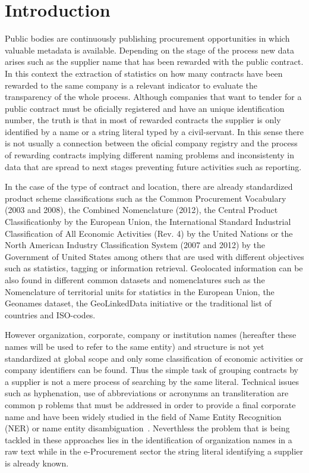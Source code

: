 \documentclass{llncs}
\begin{document}
\section{Introduction}
Public bodies are continuously publishing procurement opportunities in which 
valuable metadata is available. Depending on the stage of the process new data arises such 
as the supplier name that has been rewarded with the public contract. In this 
context the extraction of statistics on how many contracts have been 
rewarded to the same company is a relevant indicator to evaluate the transparency 
of the whole process. Although companies that want to tender for a public contract must be 
oficially registered and have an unique identification number, the truth is 
that in most of rewarded contracts the supplier is only identified by a name or a string literal typed 
by a civil-servant. In this sense there is not usually a connection between 
the oficial company registry and the process of rewarding contracts implying different 
naming problems and inconsistenty in data that are spread to next stages preventing future 
activities such as reporting.

In the case of the type of contract and location, there are already standardized~\cite{DBLP:journals/ijseke/AlvarezLSASL12} product 
scheme classifications such as the Common Procurement Vocabulary (2003 and 2008), the Combined Nomenclature (2012), 
the Central Product Classificationby by the European Union, the International Standard Industrial Classification of 
All Economic Activities (Rev. 4) by the United Nations or the North American Industry Classification System (2007 and 2012) 
by the Government of United States among others that are used with different objectives such as statistics, tagging or 
information retrieval. Geolocated information can be also found in different common datasets and nomenclatures such as 
the Nomenclature of territorial units for statistics in the European Union, the Geonames dataset, the GeoLinkedData 
initiative or the traditional list of countries and ISO-codes.

However organization, corporate, company or institution names (hereafter these names will be used to refer to 
the same entity) and structure is not yet standardized at global scope and only some classification of economic activities or 
company identifiers can be found. Thus the simple task of grouping contracts by a supplier is not a mere process of 
searching by the same literal. Technical issues such as hyphenation, use of abbreviations or acronynms an transliteration are common p
roblems that must be addressed in order to provide a final corporate name and have been widely studied in the field of 
Name Entity Recognition~\cite{citeulike:1657521} (NER) or name entity disambiguation~\cite{Sarmento:2009:AWN:1602022.1602085,Klein:2003:NER:1119176.1119204}. 
Neverthless the problem that is being tackled in these approaches lies in the identification of organization names in 
a raw text while in the e-Procurement sector the string literal identifying a supplier is already known.
\end{document}
